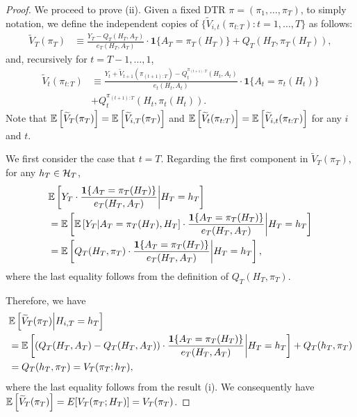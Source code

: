 \begin{proof}
We proceed to prove (ii). Given a fixed DTR $\pi=(\pi_1,\ldots,\pi_T)$, to simply notation, we define the independent copies of $\{\widetilde{V}_{i,t}(\pi_{t:T}):t=1,\ldots,T\}$ as follows:
\begin{align*}
\widetilde{V}_{T}(\pi_{T}) &\equiv \frac{ Y_{T} - Q_{T}(H_{T},A_{T}) }{e_{T}(H_{T},A_{T})}\cdot \mathbf{1}\{A_{T}=\pi_{T}(H_{T})\} + Q_{T}(H_{T},\pi_{T}(H_{T})),
\end{align*}
and, recursively for $t=T-1,\ldots,1$,
\begin{align*}
\widetilde{V}_{t}(\pi_{t:T}) &\equiv \frac{ Y_{t} + \widetilde{V}_{t+1}(\pi_{(t+1):T}) - Q_{t}^{\pi_{(t+1):T}}(H_{t},A_{t}) }{e_{t}(H_{t},A_{t})}\cdot \mathbf{1}\{A_{t}=\pi_{t}(H_{t})\} \\
&+ Q_{t}^{\pi_{(t+1):T}}(H_{t},\pi_{t}(H_{t})).
\end{align*}
Note that $\mathbb{E}\left[\widetilde{V}_{T}(\pi_{T})\right]=\mathbb{E}\left[\widetilde{V}_{i,T}(\pi_{T})\right]$ and $\mathbb{E}\left[\widetilde{V}_{t}(\pi_{t:T})\right]=\mathbb{E}\left[\widetilde{V}_{i,t}(\pi_{t:T})\right]$ for any $i$ and $t$.

We first consider the case that $t=T$. Regarding the first component in $\widetilde{V}_{T}(\pi_{T})$, for any $h_{T} \in \mathcal{H}_{T}$,
\begin{align*}
    &\mathbb{E}\left[Y_{T} \cdot \frac{\mathbf{1}\{A_{T}=\pi_{T}(H_{T})\}}{e_{T}(H_{T},A_{T})} \middle| H_{T}=h_{T}\right]\\
        &= \mathbb{E}\left[\mathbb{E}\left[Y_{T}\middle|A_{T}=\pi_{T}(H_{T}), H_{T} \right] \cdot \frac{\mathbf{1}\{A_{T}=\pi_{T}(H_{T})\}}{e_{T}(H_{T},A_{T})} \middle| H_{T}=h_{T}\right]\\
    &= \mathbb{E}\left[Q_{T}(H_{T},\pi_{T}) \cdot \frac{\mathbf{1}\{A_{T}=\pi_{T}(H_{T})\}}{e_{T}(H_{T},A_{T})} \middle| H_{T}=h_{T}\right],
\end{align*}
where the last equality follows from the definition of $Q_{T}(H_{T},\pi_{T})$.

Therefore, we have
\begin{align}
    &\mathbb{E}\left[\widetilde{V}_{T}(\pi_{T}) \middle| H_{i,T} = h_{T}\right] \nonumber\\
    &= \mathbb{E}\left[\left(Q_{T}(H_{T},A_{T}) - Q_{T}(H_{T},A_{T})\right) \cdot \frac{\mathbf{1}\{A_{T}=\pi_{T}(H_{T})\}}{e_{T}(H_{T},A_{T})} \middle| H_{T}=h_{T}\right] + Q_{T}(h_{T},\pi_{T}) \nonumber \\
    &= Q_{T}(h_{T},\pi_{T})  = V_{T}(\pi_{T};h_{T}), \label{eq:V_tile_T_to_V_T}
\end{align}
where the last equality follows from the result (i).
We consequently have $\mathbb{E}\left[\widetilde{V}_{T}(\pi_{T})\right] = \\E[V_{T}(\pi_{T};H_{T})] = V_{T}(\pi_{T})$.


\end{proof}
